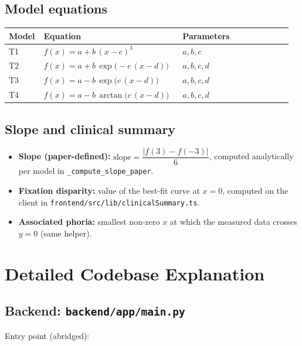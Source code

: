 \documentclass[11pt,a4paper]{article}
\begin{document}
\subsection{Model equations}
\begin{longtable}{@{}p{0.10\linewidth} p{0.48\linewidth} p{0.38\linewidth}@{}}
\toprule
\textbf{Model} & \textbf{Equation} & \textbf{Parameters} \\
\midrule
T1 & $f(x) = a + b\,(x-c)^{3}$                              & $a, b, c$ \\
T2 & $f(x) = a + b\,\exp\!\bigl(-c\,(x-d)\bigr)$            & $a, b, c, d$ \\
T3 & $f(x) = a - b\,\exp\!\bigl(c\,(x-d)\bigr)$             & $a, b, c, d$ \\
T4 & $f(x) = a - b\,\arctan\!\bigl(c\,(x-d)\bigr)$          & $a, b, c, d$ \\
\bottomrule
\end{longtable}

\subsection{Slope and clinical summary}
\begin{itemize}[leftmargin=1.2em]
  \item \textbf{Slope (paper-defined):}
        $\text{slope} = \dfrac{|f(3) - f(-3)|}{6}$, computed analytically
        per model in \texttt{\_compute\_slope\_paper}.
  \item \textbf{Fixation disparity:} value of the best-fit curve at $x=0$,
        computed on the client in
        \texttt{frontend/src/lib/clinicalSummary.ts}.
  \item \textbf{Associated phoria:} smallest non-zero $x$ at which the
        measured data crosses $y=0$ (same helper).
\end{itemize}

\section{Detailed Codebase Explanation}
\label{sec:detail}

\subsection{Backend: \texttt{backend/app/main.py}}
Entry point (abridged):
\end{document}
